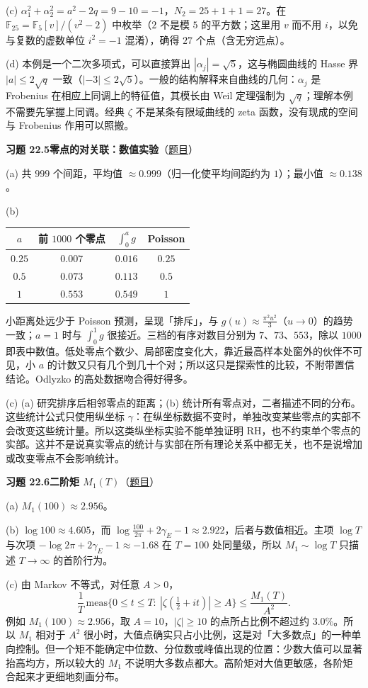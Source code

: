 \documentclass[11pt,a4paper]{article}
\newcommand{\Sol}[2]{%
  \par\addvspace{1.2em}\noindent
  \hypertarget{s:#1}{}\textbf{习题 #1\quad #2}\hfill{\small（\hyperlink{q:#1}{题目}）}\par
  \nopagebreak\smallskip}
\begin{document}
(c) $\alpha_1^2+\alpha_2^2=a^2-2q=9-10=-1$，$N_2=25+1+1=27$。在 $\mathbb F_{25}=\mathbb F_5[v]/(v^2-2)$ 中枚举（$2$ 不是模 $5$ 的平方数；这里用 $v$ 而不用 $i$，以免与复数的虚数单位 $i^2=-1$ 混淆），确得 $27$ 个点（含无穷远点）。

(d) 本例是一个二次多项式，可以直接算出 $|\alpha_j|=\sqrt5$，这与椭圆曲线的 Hasse 界 $|a|\le2\sqrt q$ 一致（$|{-3}|\le2\sqrt5$）。一般的结构解释来自曲线的几何：$\alpha_j$ 是 Frobenius 在相应上同调上的特征值，其模长由 Weil 定理强制为 $\sqrt q$；理解本例不需要先掌握上同调。经典 $\zeta$ 不是某条有限域曲线的 zeta 函数，没有现成的空间与 Frobenius 作用可以照搬。

\Sol{22.5}{零点的对关联：数值实验}
(a) 共 $999$ 个间距，平均值 $\approx0.999$（归一化使平均间距约为 $1$）；最小值 $\approx0.138$。

(b)
\begin{center}
\small
\begin{tabular}{@{}cccc@{}}
\toprule
$a$ & 前 $1000$ 个零点 & $\int_0^ag$ & Poisson \\
\midrule
$0.25$ & $0.007$ & $0.016$ & $0.25$ \\
$0.5$ & $0.073$ & $0.113$ & $0.5$ \\
$1$ & $0.553$ & $0.549$ & $1$ \\
\bottomrule
\end{tabular}
\end{center}
小距离处远少于 Poisson 预测，呈现「排斥」，与 $g(u)\approx\frac{\pi^2u^2}3$（$u\to0$）的趋势一致；$a=1$ 时与 $\int_0^1g$ 很接近。三档的有序对数目分别为 $7$、$73$、$553$，除以 $1000$ 即表中数值。低处零点个数少、局部密度变化大，靠近最高样本处窗外的伙伴不可见，小 $a$ 的计数又只有几个到几十个对；所以这只是探索性的比较，不附带置信结论。Odlyzko 的高处数据吻合得好得多。

(c) (a) 研究排序后相邻零点的距离；(b) 统计所有零点对，二者描述不同的分布。这些统计公式只使用纵坐标 $\gamma$：在纵坐标数据不变时，单独改变某些零点的实部不会改变这些统计量。所以这类纵坐标实验不能单独证明 RH，也不约束单个零点的实部。这并不是说真实零点的统计与实部在所有理论关系中都无关，也不是说增加或改变零点不会影响统计。

\Sol{22.6}{二阶矩 $M_1(T)$}
(a) $M_1(100)\approx2.956$。

(b) $\log100\approx4.605$，而 $\log\frac{100}{2\pi}+2\gamma_E-1\approx2.922$，后者与数值相近。主项 $\log T$ 与次项 $-\log2\pi+2\gamma_E-1\approx-1.68$ 在 $T=100$ 处同量级，所以 $M_1\sim\log T$ 只描述 $T\to\infty$ 的首阶行为。

(c) 由 Markov 不等式，对任意 $A>0$，
\[
  \frac1T\,\mathrm{meas}\bigl\{0\le t\le T:\ |\zeta(\tfrac12+it)|\ge A\bigr\}\le\frac{M_1(T)}{A^2}.
\]
例如 $M_1(100)\approx2.956$，取 $A=10$，$|\zeta|\ge10$ 的点所占比例不超过约 $3.0\%$。所以 $M_1$ 相对于 $A^2$ 很小时，大值点确实只占小比例，这是对「大多数点」的一种单向控制。但一个矩不能确定中位数、分位数或峰值出现的位置：少数大值可以显著抬高均方，所以较大的 $M_1$ 不说明大多数点都大。高阶矩对大值更敏感，各阶矩合起来才更细地刻画分布。
\end{document}
